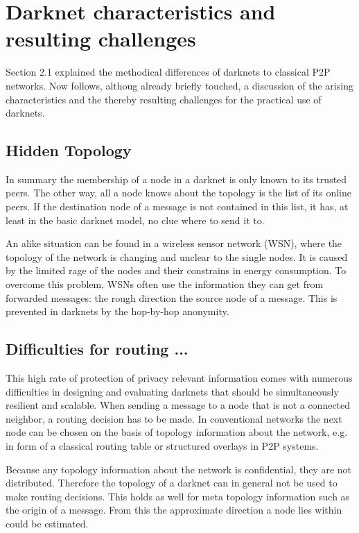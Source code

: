 \section{Darknet characteristics and resulting challenges}

Section 2.1 explained the methodical differences of darknets to classical P2P networks. Now follows, althoug already briefly touched, a discussion of the arising characteristics and the thereby resulting challenges for the practical use of darknets.

\subsection{Hidden Topology}

In summary the membership of a node in a darknet is only known to its trusted peers. The other way, all a node knows about the topology is the list of its online peers. If the destination node of a message is not contained in this list, it has, at least in the basic darknet model, no clue where to send it to.

An alike situation can be found in a wireless sensor network (WSN), where the topology of the network is changing and unclear to the single nodes. It is caused by the limited rage of the nodes and their constrains in energy consumption. To overcome this problem, WSNs often use the information they can get from forwarded messages: the rough direction the source node of a message. This is prevented in darknets by the hop-by-hop anonymity.


\subsection{Difficulties for routing ...}

This high rate of protection of privacy relevant information comes with numerous difficulties in designing and evaluating darknets that should be simultaneously resilient and scalable. When sending a message to a node that is not a connected neighbor, a routing decision has to be made. In conventional networks the next node can be chosen on the basis of topology information about the network, e.g. in form of a classical routing table or structured overlays in P2P systems.

Because any topology information about the network is confidential, they are not distributed. Therefore the topology of a darknet can in general not be used to make routing decisions. This holds as well for meta topology information such as the origin of a message. From this the approximate direction a node lies within could be estimated.


